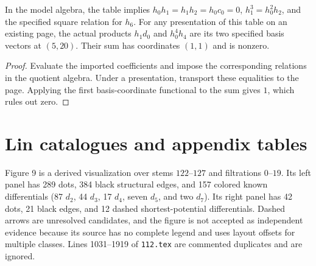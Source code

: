 \begin{lemma}
  \label{lem:lin-low-degree-table-relations}
  In the model algebra, the table implies
  $h_0h_1=h_1h_2=h_0c_0=0$, $h_1^3=h_0^2h_2$, and the specified
  square relation for $h_6$.
  For any presentation of this table on an existing page, the actual products
  $h_1d_0$ and $h_0^4h_4$ are its two specified basis vectors at $(5,20)$.
  Their sum has coordinates $(1,1)$ and is nonzero.
\end{lemma}
\begin{proof}
  Evaluate the imported coefficients and impose the corresponding relations
  in the quotient algebra.  Under a presentation, transport these equalities
  to the page.  Applying the first basis-coordinate functional to the sum
  gives $1$, which rules out zero.
\end{proof}

\section{Lin catalogues and appendix tables}

\begin{definition}
  \label{def:near126-figure-contract}
  \notready
  Figure 9 is a derived visualization over stems $122$--$127$ and filtrations
  $0$--$19$.  Its left panel has 289 dots, 384 black structural edges, and 157
  colored known differentials (87 $d_2$, 44 $d_3$, 17 $d_4$, seven $d_5$,
  and two $d_7$).  Its right panel has 42 dots, 21 black edges, and 12 dashed
  shortest-potential differentials.  Dashed arrows are unresolved candidates,
  and the figure is not accepted as independent evidence because its source
  has no complete legend and uses layout offsets for multiple classes.  Lines
  1031--1919 of \texttt{112.tex} are commented duplicates and are ignored.
\end{definition}

